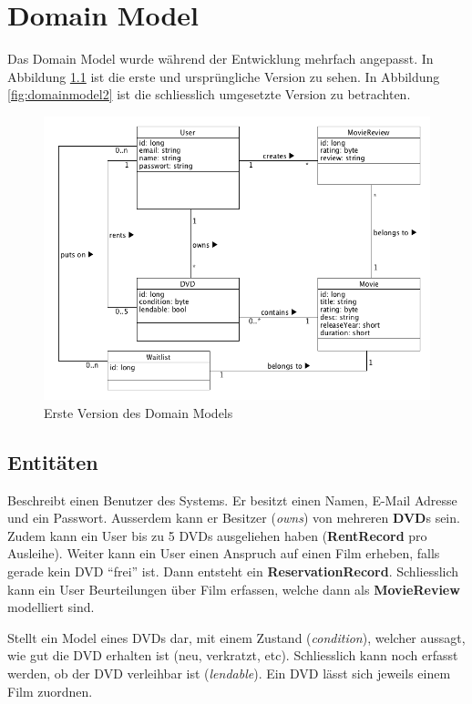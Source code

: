 \chapter{Domain Model}
\label{chap:domainmodel}
Das Domain Model wurde während der Entwicklung mehrfach angepasst. In Abbildung \ref{fig:domainmodel} ist die erste und ursprüngliche Version zu sehen. In Abbildung \ref{fig:domainmodel2} ist die schliesslich umgesetzte Version zu betrachten.


\begin{figure}[h]
	\centering
	\includegraphics[width=1\textwidth]{img/domain_model.png}
	\caption{Erste Version des Domain Models}
		\label{fig:domainmodel}
\end{figure}

\section{Entitäten}

Beschreibt einen Benutzer des Systems. Er besitzt einen Namen, E-Mail Adresse und ein Passwort. Ausserdem kann er Besitzer (\emph{owns}) von mehreren \textbf{DVD}s sein. Zudem kann ein User bis zu 5 DVDs ausgeliehen haben (\textbf{RentRecord} pro Ausleihe). Weiter kann ein User einen Anspruch auf einen Film erheben, falls gerade kein DVD \enquote{frei} ist. Dann entsteht ein \textbf{ReservationRecord}. Schliesslich kann ein User Beurteilungen über Film erfassen, welche dann als \textbf{MovieReview} modelliert sind.

Stellt ein Model eines DVDs dar, mit einem Zustand (\emph{condition}), welcher aussagt, wie gut die DVD erhalten ist (neu, verkratzt, etc). Schliesslich kann noch erfasst werden, ob der DVD verleihbar ist (\emph{lendable}). Ein DVD lässt sich jeweils einem Film zuordnen.

